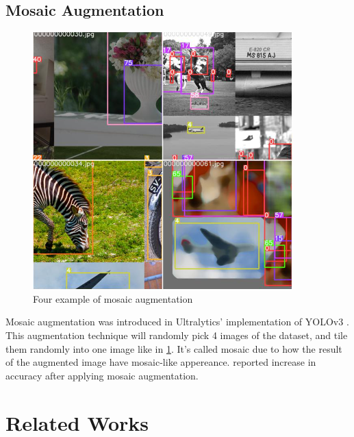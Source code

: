   \subsection{Mosaic Augmentation}
  \label{section:mosaic_study}
  \begin{figure}[H]
    \centering
    \includegraphics[scale=0.6]{figures/mosaic-aug.png}
    \caption{Four example of mosaic augmentation \parencite{yolov5}}
    \label{fig:mosaic}
  \end{figure}
  Mosaic augmentation was introduced in Ultralytics' implementation of YOLOv3 \parencite{mosaic_aug}.
  This augmentation technique will randomly pick 4 images of the dataset, and tile them randomly into one image like in \ref{fig:mosaic}.
  It's called mosaic due to how the result of the augmented image have mosaic-like appereance.
  \textcites{cspnet}{yolov4}{yolov5} reported increase in accuracy after applying mosaic augmentation.


\section{Related Works}
\label{section:relatedwork}

